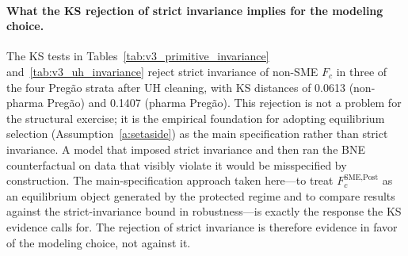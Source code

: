 \paragraph{What the KS rejection of strict invariance implies for the modeling choice.} The KS tests in Tables~\ref{tab:v3_primitive_invariance} and~\ref{tab:v3_uh_invariance} reject strict invariance of non-SME $F_c$ in three of the four Preg\~ao strata after UH cleaning, with KS distances of 0.0613 (non-pharma Preg\~ao) and 0.1407 (pharma Preg\~ao). This rejection is not a problem for the structural exercise; it is the empirical foundation for adopting equilibrium selection (Assumption~\ref{a:setaside}) as the main specification rather than strict invariance. A model that imposed strict invariance and then ran the BNE counterfactual on data that visibly violate it would be misspecified by construction. The main-specification approach taken here---to treat $F_c^{\text{SME,Post}}$ as an equilibrium object generated by the protected regime and to compare results against the strict-invariance bound in robustness---is exactly the response the KS evidence calls for. The rejection of strict invariance is therefore evidence in favor of the modeling choice, not against it.

